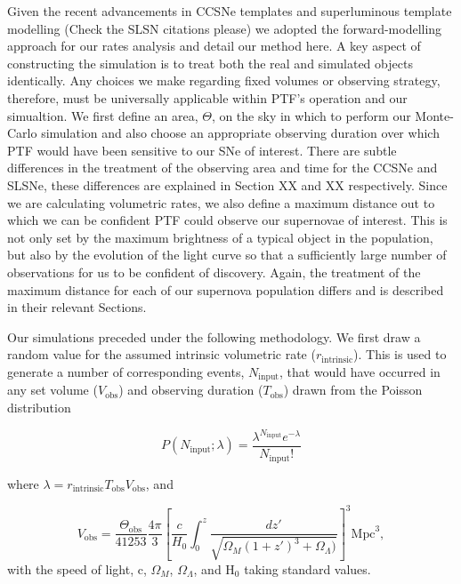 \documentclass[a4paper,fleqn,usenatbib]{mnras}
\newcommand{\chris}[1]{\color{orange}#1\color{black}}
\begin{document}
Given the recent advancements in CCSNe templates \citep{Vincenzi2019} and superluminous template modelling \citep{Angus2019,Inserra2018} \chris{(Check the SLSN citations please)} we adopted the forward-modelling approach for our rates analysis and detail our method here. A key aspect of constructing the simulation is to treat both the real and simulated objects identically. Any choices we make regarding fixed volumes or observing strategy, therefore, must be universally applicable within PTF's operation and our simualtion. We first define an area, $\Theta$, on the sky in which to perform our Monte-Carlo simulation and also choose an appropriate observing duration over which PTF would have been sensitive to our SNe of interest. There are subtle differences in the treatment of the observing area and time for the CCSNe and SLSNe, these differences are explained in Section XX and XX respectively. Since we are calculating volumetric rates, we also define a maximum distance out to which we can be confident PTF could observe our supernovae of interest. This is not only set by the maximum brightness of a typical object in the population, but also by the evolution of the light curve so that a sufficiently large number of observations for us to be confident of discovery. Again, the treatment of the maximum distance for each of our supernova population differs and is described in their relevant Sections.

Our simulations preceded under the following methodology. We first draw a random value for the assumed intrinsic volumetric rate ($r_\mathrm{intrinsic}$). This is used to generate a number of corresponding events, $N_\mathrm{input}$, that would have occurred in any set volume ($V_\mathrm{obs}$) and observing duration ($T_\mathrm{obs}$) drawn from the Poisson distribution

\begin{equation}
    \label{eqn:poiSim}
    P(N_\mathrm{input}; \lambda)=\frac{\lambda^{N_\mathrm{input}} e^{-\lambda}}{N_\mathrm{input}!}
\end{equation}

where $\lambda=r_\mathrm{intrinsic}T_\mathrm{obs}V_\mathrm{obs}$, and

\begin{equation}
V_\mathrm{obs}=\frac{\Theta_\mathrm{obs}}{41253}\frac{4\pi}{3}\left[\frac{c}{H_0} \int_{0}^{z} \frac{dz'}{\sqrt{\Omega_M(1+z')^3+\Omega_\Lambda )}}\right ]^3\textrm{Mpc}^3,
\label{eqn:volume}
\end{equation}
with the speed of light, c, $\Omega_M$, $\Omega_\Lambda$, and H$_0$ taking standard values.
\end{document}
